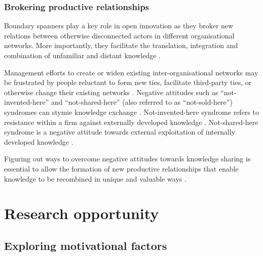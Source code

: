 \subsubsection{Brokering productive relationships}

Boundary spanners play a key role in open innovation as they broker new relations between otherwise disconnected actors in different organisational networks. More importantly, they facilitate the translation, integration and combination of unfamiliar and distant knowledge \citep{granovetter1973strength,tushman1981boundary,allen1984managing,szulanski2003sticky,burt2004structural,burt2007secondhand,seidler2008use,meyer2010rise,chesbrough2012open}. \medskip

Management efforts to create or widen existing inter-organisational networks may be frustrated by people reluctant to form new ties, facilitate third-party ties, or otherwise change their existing networks \citep{davis2010agency}. Negative attitudes such as \enquote{not-invented-here} and \enquote{not-shared-here} (also referred to as \enquote{not-sold-here}) syndromes can stymie knowledge exchange \citep{lichtenthaler2006attitudes,lichtenthaler2011your,de2014neither,podmetina2015skills,chesbrough2017future}. Not-invented-here syndrome refers to resistance within a firm against externally developed knowledge \citep{katz1982investigating,hussinger2011search,antons2015opening}. Not-shared-here syndrome is a negative attitude towards external exploitation of internally developed knowledge \citep{chesbrough2003open,lichtenthaler2006attitudes,de2014neither}. \medskip

Figuring out ways to overcome negative attitudes towards knowledge sharing is essential to allow the formation of new productive relationships that enable knowledge to be recombined in unique and valuable ways \citep{uzzi1997social,nahapiet1998social,obstfeld2005social,lane2006reification,davis2010agency,meyer2010rise}.\medskip

\section{Research opportunity}

\subsection{Exploring motivational factors}

